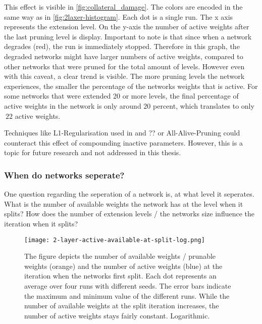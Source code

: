 This effect is visible in \ref{fig:collateral_damage}.
The colors are encoded in the same way as in \ref{fig:2laxer-histogram}.
Each dot is a single run. 
The x axis represents the extension level.
On the y-axis the number of active weights after the last pruning level is display.
Important to note is that since when a network degrades (red), the run is immediately stopped.
Therefore in this graph, the degraded networks might have larger numbers of active weights, compared to other networks that were pruned for the total amount of levels.
However even with this caveat, a clear trend is visible.
The more pruning levels the network experiences, the smaller the percentage of the networks weights that is active.
For some networks that were extended 20 or more levels, the final percentage of active weights in the network is only around $20$ percent, which translates to only $~22$ active weights.

Techniques like L1-Regularisation used in \autocite{HanEtAl15} and \autocite{Frankle}?? or All-Alive-Pruning \autocite{AllAlivePruning} could counteract this effect of compounding inactive parameters.
However, this is a topic for future research and not addressed in this thesis. 

\subsubsection{When do networks seperate?}
One question regarding the seperation of a network is, at what level it seperates.
What is the number of available weights the network has at the level when it splits?
How does the number of extension levels / the networks size influence the iteration when it splits?

\begin{figure}[ht]
    \centering
    \texttt{[image: 2-layer-active-available-at-split-log.png]}
    \caption{
        The figure depicts the number of available weights / prunable weights (orange) and the number of active weights (blue) at the iteration when the networks first split.
        Each dot represents an average over four runs with different seeds.
        The error bars indicate the maximum and minimum value of the different runs.
        While the number of available weights at the split iteration increases, the number of active weights stays fairly constant.
        Logarithmic.
    }
    \label{fig:2l-active-split}
\end{figure}

